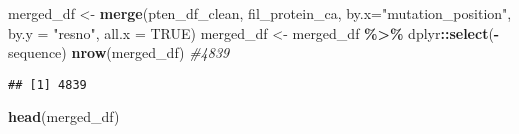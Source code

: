 \documentclass[
]{article}
\newenvironment{Shaded}{\begin{snugshade}}{\end{snugshade}}
\newcommand{\AttributeTok}[1]{\textcolor[rgb]{0.13,0.29,0.53}{#1}}
\newcommand{\CommentTok}[1]{\textcolor[rgb]{0.56,0.35,0.01}{\textit{#1}}}
\newcommand{\ConstantTok}[1]{\textcolor[rgb]{0.56,0.35,0.01}{#1}}
\newcommand{\FunctionTok}[1]{\textcolor[rgb]{0.13,0.29,0.53}{\textbf{#1}}}
\newcommand{\NormalTok}[1]{#1}
\newcommand{\OtherTok}[1]{\textcolor[rgb]{0.56,0.35,0.01}{#1}}
\newcommand{\SpecialCharTok}[1]{\textcolor[rgb]{0.81,0.36,0.00}{\textbf{#1}}}
\newcommand{\StringTok}[1]{\textcolor[rgb]{0.31,0.60,0.02}{#1}}
\begin{document}
\begin{Shaded}
\begin{Highlighting}[]
\NormalTok{merged\_df }\OtherTok{\textless{}{-}} \FunctionTok{merge}\NormalTok{(pten\_df\_clean, fil\_protein\_ca, }\AttributeTok{by.x=}\StringTok{"mutation\_position"}\NormalTok{, }\AttributeTok{by.y =} \StringTok{"resno"}\NormalTok{, }\AttributeTok{all.x =} \ConstantTok{TRUE}\NormalTok{)}
\NormalTok{merged\_df }\OtherTok{\textless{}{-}}\NormalTok{ merged\_df }\SpecialCharTok{\%\textgreater{}\%}\NormalTok{ dplyr}\SpecialCharTok{::}\FunctionTok{select}\NormalTok{(}\SpecialCharTok{{-}}\NormalTok{sequence)}
\FunctionTok{nrow}\NormalTok{(merged\_df) }\CommentTok{\#4839}
\end{Highlighting}
\end{Shaded}

\begin{verbatim}
## [1] 4839
\end{verbatim}

\begin{Shaded}
\begin{Highlighting}[]
\FunctionTok{head}\NormalTok{(merged\_df)}
\end{Highlighting}
\end{Shaded}
\end{document}
